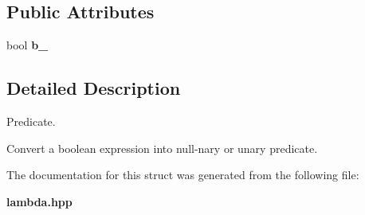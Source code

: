\subsection*{Public Attributes}
\begin{CompactItemize}
\item 
bool \textbf{b\_\-}\label{structam_1_1lambda_1_1condition_19014c303208f7d24845652348737106}

\end{CompactItemize}


\subsection{Detailed Description}
Predicate. 

Convert a boolean expression into null-nary or unary predicate. 



The documentation for this struct was generated from the following file:\begin{CompactItemize}
\item 
{\bf lambda.hpp}\end{CompactItemize}
